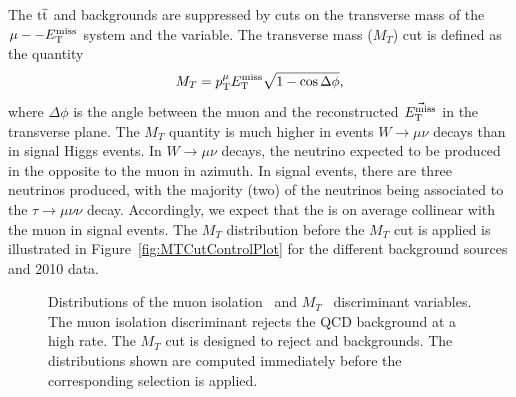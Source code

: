 The $\mathrm{t}\overline{\mathrm{t}}$ and \WpJets backgrounds
are suppressed by cuts on the transverse mass of the $\mu--E_{\mathrm{T}}^{\text{miss}}$ system and the
\Pzeta variable.  The transverse mass ($M_T$) cut is defined as the quantity
\begin{equation}
  M_T = p_{\mathrm{T}}^\mu E_{\mathrm{T}}^{\text{miss}} \sqrt{1 - \cos \Delta\phi},
\end{equation}
where $\Delta\phi$ is the angle between the muon and the reconstructed
$\vec{E_{\mathrm{T}}^{\text{miss}}}$ in the transverse plane.  The $M_T$ quantity is much higher in
events $W \to \mu \nu$ decays than in signal Higgs events.  In $W \to \mu \nu$
decays, the neutrino expected to be produced in the opposite to the muon in
azimuth.  In signal events, there are three neutrinos produced, with the
majority (two) of the neutrinos being associated to the $\tau \to \mu \nu \nu$
decay.  Accordingly, we expect that the \MET is on average collinear with the
muon in signal events.  The $M_T$ distribution before the $M_T$ cut is applied
is illustrated in Figure~\ref{fig:MTCutControlPlot} for the different background
sources and 2010 data.
\begin{figure}
  \centering
   \caption[Distributions of $M_T$ and muon
  isolation discriminants] {Distributions of the muon
  isolation~ and
  $M_T$~ discriminant variables.  The muon
  isolation discriminant rejects the QCD background at a high rate.  The $M_T$
  cut is designed to reject \WpJets and \ttbarpJets backgrounds. The
  distributions shown are computed immediately before the corresponding
  selection is applied.} \label{fig:CutFlowControlPlots}
\end{figure}
